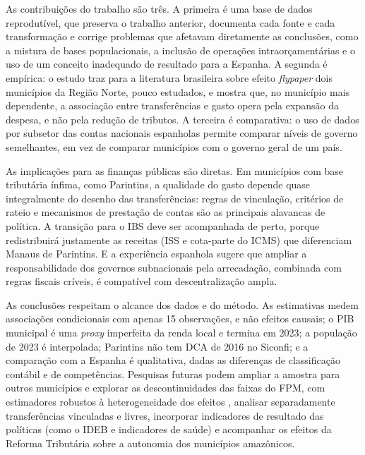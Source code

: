 As contribuições do trabalho são três. A primeira é uma base de dados reprodutível, que preserva o trabalho anterior, documenta cada fonte e cada transformação e corrige problemas que afetavam diretamente as conclusões, como a mistura de bases populacionais, a inclusão de operações intraorçamentárias e o uso de um conceito inadequado de resultado para a Espanha. A segunda é empírica: o estudo traz para a literatura brasileira sobre efeito \textit{flypaper} dois municípios da Região Norte, pouco estudados, e mostra que, no município mais dependente, a associação entre transferências e gasto opera pela expansão da despesa, e não pela redução de tributos. A terceira é comparativa: o uso de dados por subsetor das contas nacionais espanholas permite comparar níveis de governo semelhantes, em vez de comparar municípios com o governo geral de um país.

As implicações para as finanças públicas são diretas. Em municípios com base tributária ínfima, como Parintins, a qualidade do gasto depende quase integralmente do desenho das transferências: regras de vinculação, critérios de rateio e mecanismos de prestação de contas são as principais alavancas de política. A transição para o IBS deve ser acompanhada de perto, porque redistribuirá justamente as receitas (ISS e cota-parte do ICMS) que diferenciam Manaus de Parintins. E a experiência espanhola sugere que ampliar a responsabilidade dos governos subnacionais pela arrecadação, combinada com regras fiscais críveis, é compatível com descentralização ampla.

As conclusões respeitam o alcance dos dados e do método. As estimativas medem associações condicionais com apenas 15 observações, e não efeitos causais; o PIB municipal é uma \textit{proxy} imperfeita da renda local e termina em 2023; a população de 2023 é interpolada; Parintins não tem DCA de 2016 no Siconfi; e a comparação com a Espanha é qualitativa, dadas as diferenças de classificação contábil e de competências. Pesquisas futuras podem ampliar a amostra para outros municípios e explorar as descontinuidades das faixas do FPM, com estimadores robustos à heterogeneidade dos efeitos \cite{callaway2021,dechaisemartin2020}, analisar separadamente transferências vinculadas e livres, incorporar indicadores de resultado das políticas (como o IDEB e indicadores de saúde) e acompanhar os efeitos da Reforma Tributária sobre a autonomia dos municípios amazônicos.
